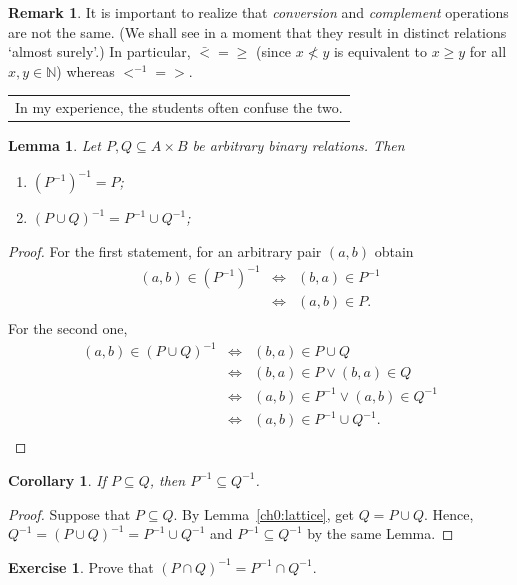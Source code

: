 \documentclass[12pt,notitlepage]{article}
\theoremstyle{plain}
\newtheorem{lemma}[thm]{Lemma}
\newtheorem{corr}[thm]{Corollary}
\theoremstyle{definition}
\newtheorem{exc}[thm]{Exercise}
\newtheorem{rem}[thm]{Remark}
\theoremstyle{plain}
\newcommand{\N}{\mathbb{N}}
\newcommand{\sbs}{\subseteq}
\newcommand{\1}{\mathbf{1}}
\newcommand{\0}{\mathbf{0}}
\newcommand{\mcomm}[1]{
\medskip\noindent\begin{tabular}{| l}
\parbox{0.99\textwidth}{{\small
#1 }}\end{tabular}
\smallskip}
\begin{document}
\begin{rem}
It is important to realize that \emph{conversion} and \emph{complement} operations are not the same. (We shall see in a moment that they result in distinct relations `almost surely'.) In particular, ${\bar <} = {\geq}$ (since $x \not< y$ is equivalent to $x \geq y$ for all $x, y \in \N$) whereas ${<}^{-1} = {>}$.
\end{rem}
\mcomm{In my experience, the students often confuse the two.}

\begin{lemma} Let $P, Q \sbs A \times B$ be arbitrary binary relations. Then
\begin{enumerate}
\item $(P^{-1})^{-1} = P$;
\item $(P \cup Q)^{-1} = P^{-1} \cup Q^{-1}$;
\end{enumerate}
\end{lemma}
\begin{proof}
For the first statement, for an arbitrary pair $(a,b)$ obtain
$$
\begin{array}{rcl}
(a, b) \in (P^{-1})^{-1} &\iff& (b,a) \in P^{-1}\\
&\iff&  (a,b) \in P.\\
\end{array}
$$
For the second one, 
$$
\begin{array}{rcl}
(a, b) \in (P \cup Q)^{-1} &\iff& (b,a) \in P \cup Q\\
&\iff& (b,a) \in P \vee (b,a) \in Q\\
&\iff& (a,b) \in P^{-1} \vee (a,b) \in Q^{-1}\\
&\iff& (a,b) \in P^{-1} \cup Q^{-1}.\\
\end{array}
$$
\end{proof}
\begin{corr}
If $P \sbs Q$, then $P^{-1} \sbs Q^{-1}$.
\end{corr}
\begin{proof}
Suppose that $P \sbs Q$. By Lemma~\ref{ch0:lattice}, get $Q = P \cup Q$. Hence,
$Q^{-1} = (P \cup Q)^{-1} = P^{-1} \cup Q^{-1}$
and $P^{-1} \sbs Q^{-1}$ by the same Lemma.
\end{proof}

\begin{exc}
Prove that $(P \cap Q)^{-1} = P^{-1} \cap Q^{-1}$.
\end{exc}
\end{document}

